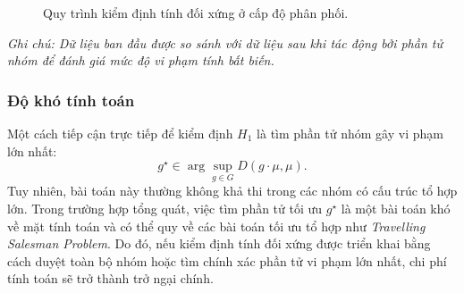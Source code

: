 \begin{figure}[H]
    \centering
    \caption[Quy trình kiểm định tính đối xứng ở cấp độ phân phối]{%
      Quy trình kiểm định tính đối xứng ở cấp độ phân phối.\\[4pt]
    }
    \label{fig:symmetry-testing-pipeline}
\end{figure}
\vspace{-2.0em}
\noindent\textit{Ghi chú: Dữ liệu ban đầu được so sánh với dữ liệu sau khi tác động bởi phần tử nhóm để đánh giá mức độ vi phạm tính bất biến.}

\subsubsection{Độ khó tính toán}

Một cách tiếp cận trực tiếp để kiểm định $H_1$ là tìm phần tử nhóm gây vi phạm lớn nhất:
\begin{equation}
    g^\star \in \arg\sup_{g \in G} D(g \cdot \mu, \mu).
    \label{eq:symmetry-testing-argmax}
\end{equation}
Tuy nhiên, bài toán này thường không khả thi trong các nhóm có cấu trúc tổ hợp lớn. Trong trường hợp tổng quát, việc tìm phần tử tối ưu $g^\star$ là một bài toán khó về mặt tính toán và có thể quy về các bài toán tối ưu tổ hợp như \textit{Travelling Salesman Problem}. Do đó, nếu kiểm định tính đối xứng được triển khai bằng cách duyệt toàn bộ nhóm hoặc tìm chính xác phần tử vi phạm lớn nhất, chi phí tính toán sẽ trở thành trở ngại chính.

